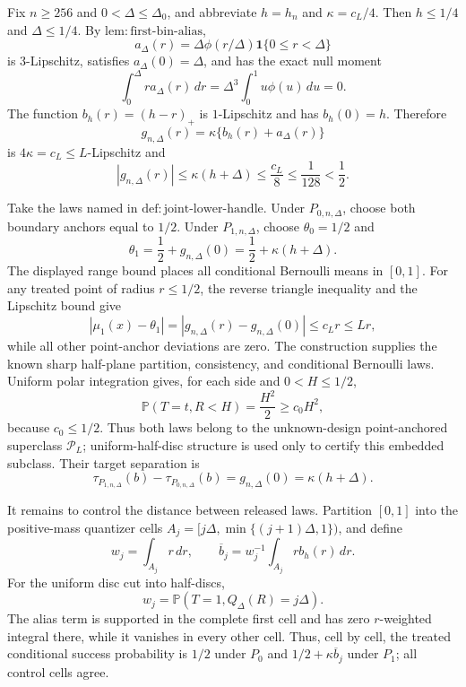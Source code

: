 Fix \(n\geq256\) and \(0<\Delta\leq\Delta_0\), and abbreviate \(h=h_n\) and \(\kappa=c_L/4\).  Then \(h\leq1/4\) and \(\Delta\leq1/4\).  By \(\mathrm{lem:first\text{-}bin\text{-}alias}\),
\[
 a_\Delta(r)=\Delta\phi(r/\Delta)\mathbf1\{0\leq r<\Delta\}
\]
is \(3\)-Lipschitz, satisfies \(a_\Delta(0)=\Delta\), and has the exact null moment
\[
 \int_0^\Delta ra_\Delta(r)\,dr
 =\Delta^3\int_0^1u\phi(u)\,du=0.
\]
The function \(b_h(r)=(h-r)_+\) is \(1\)-Lipschitz and has \(b_h(0)=h\).  Therefore
\[
 g_{n,\Delta}(r)=\kappa\{b_h(r)+a_\Delta(r)\}
\]
is \(4\kappa=c_L\leq L\)-Lipschitz and
\[
 |g_{n,\Delta}(r)|
 \leq\kappa(h+\Delta)
 \leq\frac{c_L}{8}
 \leq\frac1{128}<\frac12.
\]

Take the laws named in \(\mathrm{def:joint\text{-}lower\text{-}handle}\).  Under \(P_{0,n,\Delta}\), choose both boundary anchors equal to \(1/2\).  Under \(P_{1,n,\Delta}\), choose \(\theta_0=1/2\) and
\[
 \theta_1=\frac12+g_{n,\Delta}(0)
 =\frac12+\kappa(h+\Delta).
\]
The displayed range bound places all conditional Bernoulli means in \([0,1]\).  For any treated point of radius \(r\leq1/2\), the reverse triangle inequality and the Lipschitz bound give
\[
 |\mu_1(x)-\theta_1|
 =|g_{n,\Delta}(r)-g_{n,\Delta}(0)|
 \leq c_Lr\leq Lr,
\]
while all other point-anchor deviations are zero.  The construction supplies the known sharp half-plane partition, consistency, and conditional Bernoulli laws.  Uniform polar integration gives, for each side and \(0<H\leq1/2\),
\[
 \mathbb P(T=t,R<H)=\frac{H^2}{2}\geq c_0H^2,
\]
because \(c_0\leq1/2\).  Thus both laws belong to the unknown-design point-anchored superclass \(\mathcal P_L\); uniform-half-disc structure is used only to certify this embedded subclass.  Their target separation is
\[
 \tau_{P_{1,n,\Delta}}(b)-\tau_{P_{0,n,\Delta}}(b)
 =g_{n,\Delta}(0)=\kappa(h+\Delta).
\]

It remains to control the distance between released laws.  Partition \([0,1]\) into the positive-mass quantizer cells \(A_j=[j\Delta,\min\{(j+1)\Delta,1\})\), and define
\[
 w_j=\int_{A_j}r\,dr,
 \qquad
 \overline b_j=w_j^{-1}\int_{A_j}rb_h(r)\,dr.
\]
For the uniform disc cut into half-discs,
\[
 w_j=\mathbb P(T=1,Q_\Delta(R)=j\Delta).
\]
The alias term is supported in the complete first cell and has zero \(r\)-weighted integral there, while it vanishes in every other cell.  Thus, cell by cell, the treated conditional success probability is \(1/2\) under \(P_0\) and \(1/2+\kappa\overline b_j\) under \(P_1\); all control cells agree.

